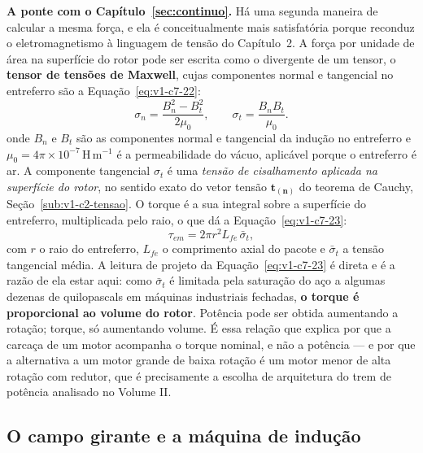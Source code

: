 \documentclass[12pt,a4paper]{article}
\numberwithin{equation}{section}
\numberwithin{table}{section}
\numberwithin{figure}{section}
\begin{document}
\textbf{A ponte com o Capítulo~\ref{sec:continuo}.} Há uma segunda maneira de
calcular a mesma força, e ela é conceitualmente mais satisfatória porque
reconduz o eletromagnetismo à linguagem de tensão do Capítulo~2. A força por
unidade de área na superfície do rotor pode ser escrita como o divergente de um
tensor, o \textbf{tensor de tensões de Maxwell}, cujas componentes normal e
tangencial no entreferro são a Equação~\eqref{eq:v1-c7-22}:
\begin{equation}\label{eq:v1-c7-22}
\sigma_{n} = \frac{B_n^{2} - B_t^{2}}{2\mu_0},
\qquad
\sigma_{t} = \frac{B_n B_t}{\mu_0} .
\end{equation}
onde $B_n$ e $B_t$ são as componentes normal e tangencial da indução no
entreferro e $\mu_0 = 4\pi\times10^{-7}\,$H\,m$^{-1}$ é a permeabilidade do
vácuo, aplicável porque o entreferro é ar.
A componente tangencial $\sigma_t$ é uma \emph{tensão de cisalhamento
aplicada na superfície do rotor}, no sentido exato do vetor tensão
$\mathbf{t}_{(\mathbf{n})}$ do teorema de Cauchy,
Seção~\ref{sub:v1-c2-tensao}. O torque é a sua integral sobre a superfície do
entreferro, multiplicada pelo raio, o que dá a Equação~\eqref{eq:v1-c7-23}:
\begin{equation}\label{eq:v1-c7-23}
\tau_{em} = 2\pi r^{2} L_{fe}\,\bar{\sigma}_{t},
\end{equation}
com $r$ o raio do entreferro, $L_{fe}$ o comprimento axial do pacote e
$\bar{\sigma}_t$ a tensão tangencial média. A leitura de projeto da
Equação~\eqref{eq:v1-c7-23} é direta e é a razão de ela estar aqui: como
$\bar{\sigma}_t$ é limitada pela saturação do aço a algumas dezenas de
quilopascals em máquinas industriais fechadas, \textbf{o torque é proporcional
ao volume do rotor}. Potência pode ser obtida aumentando a rotação; torque, só
aumentando volume. É essa relação que explica por que a carcaça de um motor
acompanha o torque nominal, e não a potência --- e por que a alternativa a um
motor grande de baixa rotação é um motor menor de alta rotação com redutor, que
é precisamente a escolha de arquitetura do trem de potência analisado no
Volume II.

\subsection{O campo girante e a máquina de indução}\label{sub:v1-c7-inducao}
\end{document}
